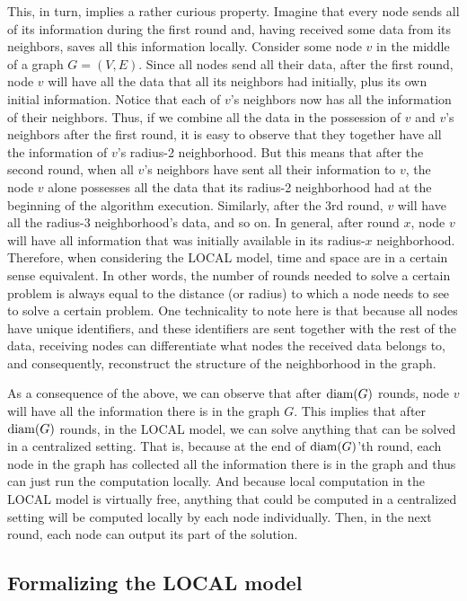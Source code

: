 This, in turn, implies a rather
curious property. Imagine that every node sends all of its information during the first round
and, having received some data from its neighbors, saves all this information locally. Consider
some node $v$ in the middle of a graph $G = (V, E)$. Since all nodes send all their data,
after the first round, node $v$
will have all the data that all its neighbors had initially, plus its own initial information.
Notice that each of $v$'s neighbors now has all the information of their neighbors. Thus,
if we combine all the data in the possession of $v$ and $v$'s neighbors after the first round, it
is easy to observe that they together have all the information of $v$'s radius-2 neighborhood.
But this means that after the second round, when all $v$'s neighbors have sent all their
information to $v$, the node $v$ alone possesses all the data that its radius-2 neighborhood had at the
beginning of the algorithm execution. Similarly, after the 3rd round, $v$ will have all the
radius-3 neighborhood's data, and so on.
In general, after round $x$, node $v$ will have
all information that was initially available in its radius-$x$ neighborhood.
Therefore, when considering the LOCAL model,
time and space are in a certain sense equivalent. In other words, the number of rounds
needed to solve a certain problem is always equal to the distance (or radius) to which a node needs to
see to solve a certain problem. One technicality to note here is that because all nodes have
unique identifiers, and these identifiers are sent together with the rest of the data,
receiving nodes can differentiate what nodes the received data belongs to, and consequently,
reconstruct the structure of the neighborhood in the graph.

As a consequence of the above,
we can observe that after $\operatorname{diam}(G)$ rounds, node $v$ will have all the information there is in the 
graph $G$. This implies that after $\operatorname{diam}(G)$ rounds, in the LOCAL model, we can solve anything that can
be solved in a centralized setting. That is, because at the end of $\operatorname{diam}(G)$'th round, each node in the
graph has collected all the information there is in the graph and thus can just run the
computation locally. And because local computation in the LOCAL model is virtually free,
anything that could be computed in a centralized setting will be computed locally by each
node individually. Then, in the next round, each node can output its part of the solution.

\subsection{Formalizing the LOCAL model}

